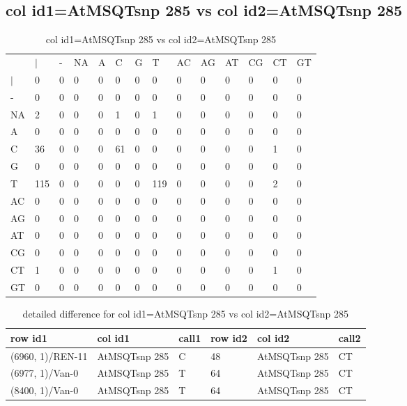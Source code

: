 \subsection{col id1=AtMSQTsnp 285 vs col id2=AtMSQTsnp 285}
\begin{center}
\begin{longtable}{|l|l|l|l|l|l|l|l|l|l|l|l|l|l|}
\caption{col id1=AtMSQTsnp 285 vs col id2=AtMSQTsnp 285} \label{table_dm820}\\
\hline
\\
\hline
&$|$&-&NA&A&C&G&T&AC&AG&AT&CG&CT&GT\\
$|$&0&0&0&0&0&0&0&0&0&0&0&0&0\\
-&0&0&0&0&0&0&0&0&0&0&0&0&0\\
NA&2&0&0&0&1&0&1&0&0&0&0&0&0\\
A&0&0&0&0&0&0&0&0&0&0&0&0&0\\
C&36&0&0&0&61&0&0&0&0&0&0&1&0\\
G&0&0&0&0&0&0&0&0&0&0&0&0&0\\
T&115&0&0&0&0&0&119&0&0&0&0&2&0\\
AC&0&0&0&0&0&0&0&0&0&0&0&0&0\\
AG&0&0&0&0&0&0&0&0&0&0&0&0&0\\
AT&0&0&0&0&0&0&0&0&0&0&0&0&0\\
CG&0&0&0&0&0&0&0&0&0&0&0&0&0\\
CT&1&0&0&0&0&0&0&0&0&0&0&1&0\\
GT&0&0&0&0&0&0&0&0&0&0&0&0&0\\
\hline
\end{longtable}
\end{center}

\begin{center}
\begin{longtable}{|l|l|l|l|l|l|}
\caption{detailed difference for col id1=AtMSQTsnp 285 vs col id2=AtMSQTsnp 285} \label{table_dm821}\\
\hline
row id1&col id1&call1&row id2&col id2&call2\\
\hline
(6960, 1)/REN-11&AtMSQTsnp 285&C&48&AtMSQTsnp 285&CT\\
(6977, 1)/Van-0&AtMSQTsnp 285&T&64&AtMSQTsnp 285&CT\\
(8400, 1)/Van-0&AtMSQTsnp 285&T&64&AtMSQTsnp 285&CT\\
\hline
\end{longtable}
\end{center}

